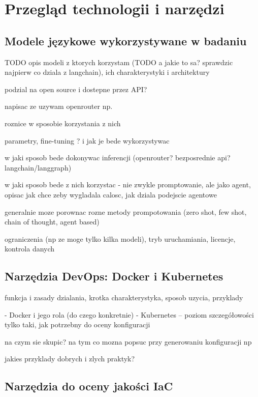 \clearpage %
\section{Przegląd technologii i narzędzi}

\subsection{Modele językowe wykorzystywane w badaniu}

TODO opis modeli z ktorych korzystam (TODO a jakie to sa? sprawdzic najpierw co dziala z langchain), ich charakterystyki i architektury

podzial na open source i dostepne przez API?

napisac ze uzywam openrouter np.

roznice w sposobie korzystania z nich

parametry, fine-tuning ? i jak je bede wykorzystywac

w jaki sposob bede dokonywac inferencji (openrouter? bezposrednie api? langchain/langgraph)

w jaki sposob bede z nich korzystac - nie zwykle promptowanie, ale jako agent, opisac jak chce zeby wygladala calosc, jak dziala podejscie agentowe

generalnie moze porownac rozne metody prompotowania (zero shot, few shot, chain of thought, agent based)

ograniczenia (np ze moge tylko kilka modeli), tryb uruchamiania, licencje, kontrola danych

\subsection{Narzędzia DevOps: Docker i Kubernetes}

funkcja i zasady dzialania, krotka charakterystyka, sposob uzycia, przyklady

- Docker i jego rola (do czego konkretnie)
- Kubernetes – poziom szczegółowości tylko taki, jak potrzebny do oceny konfiguracji

na czym sie skupic? na tym co mozna popsuc przy generowaniu konfiguracji np

jakies przyklady dobrych i zlych praktyk?

\subsection{Narzędzia do oceny jakości IaC}

